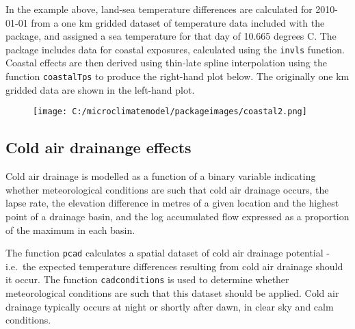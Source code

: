 \documentclass[]{article}
\begin{document}
In the example above, land-sea temperature differences are calculated
for 2010-01-01 from a one km gridded dataset of temperature data
included with the package, and assigned a sea temperature for that day
of 10.665 degrees C. The package includes data for coastal exposures,
calculated using the \texttt{invls} function. Coastal effects are then
derived using thin-late spline interpolation using the function
\texttt{coastalTps} to produce the right-hand plot below. The originally
one km gridded data are shown in the left-hand plot.

\begin{figure}
\centering
\texttt{[image: C:/microclimatemodel/packageimages/coastal2.png]}
\caption{}
\end{figure}

\subsection{Cold air drainange
effects}\label{cold-air-drainange-effects}

Cold air drainage is modelled as a function of a binary variable
indicating whether meteorological conditions are such that cold air
drainage occurs, the lapse rate, the elevation difference in metres of a
given location and the highest point of a drainage basin, and the log
accumulated flow expressed as a proportion of the maximum in each basin.

The function \texttt{pcad} calculates a spatial dataset of cold air
drainage potential - i.e.~the expected temperature differences resulting
from cold air drainage should it occur. The function
\texttt{cadconditions} is used to determine whether meteorological
conditions are such that this dataset should be applied. Cold air
drainage typically occurs at night or shortly after dawn, in clear sky
and calm conditions.
\end{document}
